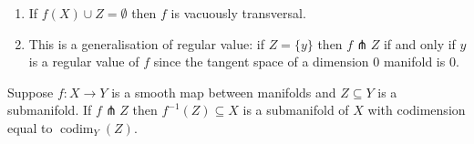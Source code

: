 \documentclass[a4paper]{article}
\DeclareMathOperator{\codim}{codim}
\begin{document}
\begin{remark}\leavevmode
  \begin{enumerate}
  \item If \(f(X) \cup Z = \emptyset\) then \(f\) is vacuously transversal.
  \item This is a generalisation of regular value: if \(Z = \{y\}\) then \(f \pitchfork Z\) if and only if \(y\) is a regular value of \(f\) since the tangent space of a dimension \(0\) manifold is \(0\).
  \end{enumerate}
\end{remark}

\begin{theorem}
  Suppose \(f: X \to Y\) is a smooth map between manifolds and \(Z \subseteq Y\) is a submanifold. If \(f \pitchfork Z\) then \(f^{-1}(Z) \subseteq X\) is a submanifold of \(X\) with codimension equal to \(\codim_Y(Z)\).
\end{theorem}



\printindex

\iffalse
Classical differential geometry concerning geometries of curves and surfaces, from a modern point of view

Contents:
I: notions of smmoth \(k\)-dim manifolds. We study differntial topology.

Geometry is concerned with the study of rigid motions

invariants of curves: \(k\) curvature, \(\tau\) torsion
invariant of surfaces: \(K\) mean curvature, \(K\) Gaussian curvature
\fi
\end{document}
